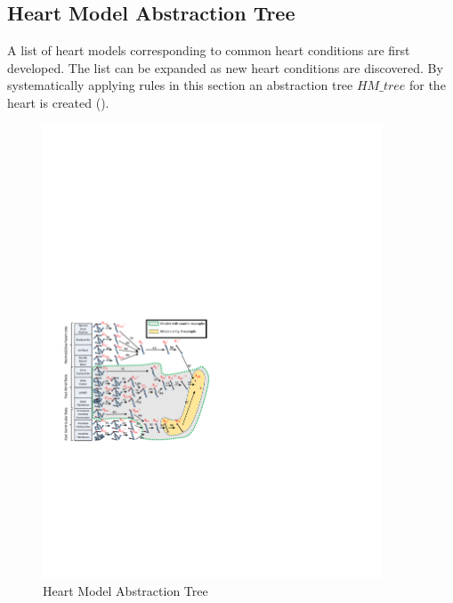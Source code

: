 \subsection{Heart Model Abstraction Tree}
A list of heart models corresponding to common heart conditions are first developed. The list can be expanded as new heart conditions are discovered.
By systematically applying rules in this section an abstraction tree $HM\_tree$ for the heart is created (). 
\begin{figure}[!t]
	\centering
	\includegraphics[width=0.9\textwidth]{figs/abs.pdf}
	\caption{\small Heart Model Abstraction Tree}
	\label{fig:HM_abs}
\end{figure}


